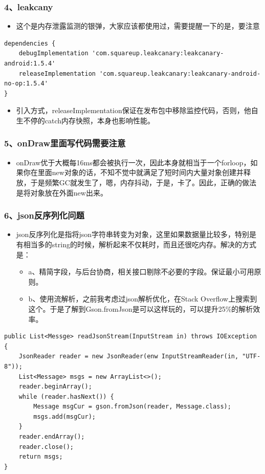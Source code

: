 \documentclass[9pt, b5paper]{article}
\begin{document}
\subsubsection{4、leakcany}
\label{sec-1-8-4}
\begin{itemize}
\item 这个是内存泄露监测的银弹，大家应该都使用过，需要提醒一下的是，要注意
\end{itemize}
\begin{verbatim}
dependencies {
    debugImplementation 'com.squareup.leakcanary:leakcanary-android:1.5.4'
    releaseImplementation 'com.squareup.leakcanary:leakcanary-android-no-op:1.5.4'
}
\end{verbatim}
\begin{itemize}
\item 引入方式，releaseImplementation保证在发布包中移除监控代码，否则，他自生不停的catch内存快照，本身也影响性能。
\end{itemize}
\subsubsection{5、onDraw里面写代码需要注意}
\label{sec-1-8-5}
\begin{itemize}
\item onDraw优于大概每16ms都会被执行一次，因此本身就相当于一个forloop，如果你在里面new对象的话，不知不觉中就满足了短时间内大量对象创建并释放，于是频繁GC就发生了，嗯，内存抖动，于是，卡了。因此，正确的做法是将对象放在外面new出来。
\end{itemize}
\subsubsection{6、json反序列化问题}
\label{sec-1-8-6}
\begin{itemize}
\item json反序列化是指将json字符串转变为对象，这里如果数据量比较多，特别是有相当多的string的时候，解析起来不仅耗时，而且还很吃内存。解决的方式是：
\begin{itemize}
\item a、精简字段，与后台协商，相关接口剔除不必要的字段。保证最小可用原则。
\item b、使用流解析，之前我考虑过json解析优化，在Stack Overflow上搜索到这个。于是了解到Gson.fromJson是可以这样玩的，可以提升25\%的解析效率。
\end{itemize}
\end{itemize}
\begin{verbatim}
public List<Messge> readJsonStream(InputStream in) throws IOException {
    JsonReader reader = new JsonReader(enw InputStreamReader(in, "UTF-8"));
    List<Message> msgs = new ArrayList<>();
    reader.beginArray();
    while (reader.hasNext()) {
        Message msgCur = gson.fromJson(reader, Message.class);
        msgs.add(msgCur);
    }
    reader.endArray();
    reader.close();
    return msgs;
}
\end{verbatim}
\end{document}

